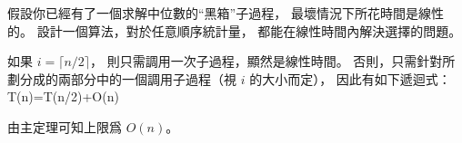 \startEXERCISE
假設你已經有了一個求解中位數的“黑箱”子過程，
最壞情況下所花時間是線性的。
設計一個算法，對於任意順序統計量，
都能在線性時間內解決選擇的問題。
\stopEXERCISE

\startANSWER
如果 $i=\lceil n/2\rceil$，
則只需調用一次子過程，顯然是線性時間。
否則，只需針對所劃分成的兩部分中的一個調用子過程（視 $i$ 的大小而定），
因此有如下遞迴式：
\startsplitformula
T(n)=T(n/2)+O(n)
\stopsplitformula

由主定理可知上限爲 $O(n)$。
\stopANSWER
